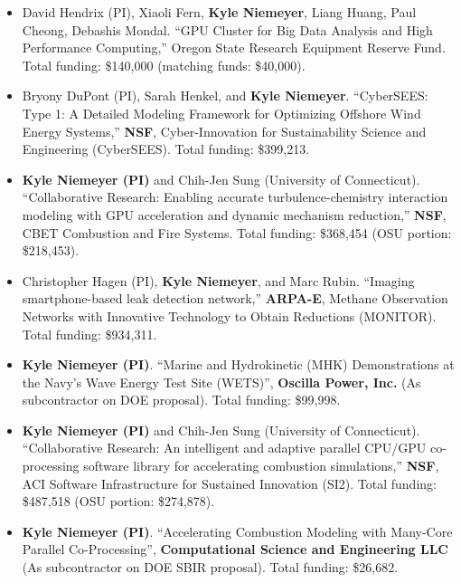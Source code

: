 \documentclass[margin,line,11pt]{res}
\begin{document}
\begin{resume}
\begin{itemize}[leftmargin=*]

\item David Hendrix (PI), Xiaoli Fern, \textbf{Kyle Niemeyer}, Liang Huang, Paul Cheong, Debashis Mondal. ``GPU Cluster for Big Data Analysis and High Performance Computing,'' Oregon State Research Equipment Reserve Fund. Total funding: \$140,000 (matching funds: \$40,000).

\item Bryony DuPont (PI), Sarah Henkel, and \textbf{Kyle Niemeyer}. ``CyberSEES: Type 1: A Detailed Modeling Framework for Optimizing Offshore Wind Energy Systems,'' \textbf{NSF}, Cyber-Innovation for Sustainability Science and Engineering (CyberSEES). Total funding: \$399,213.

\item \textbf{Kyle Niemeyer (PI)} and Chih-Jen Sung (University of Connecticut). ``Collaborative Research: Enabling accurate turbulence-chemistry interaction modeling with GPU acceleration and dynamic mechanism reduction,'' \textbf{NSF}, CBET Combustion and Fire Systems. Total funding: \$368,454 (OSU portion: \$218,453).

\item Christopher Hagen (PI), \textbf{Kyle Niemeyer}, and Marc Rubin. ``Imaging smartphone-based leak detection network,'' \textbf{ARPA-E}, Methane Observation Networks with Innovative Technology to Obtain Reductions (MONITOR). Total funding: \$934,311.

\item \textbf{Kyle Niemeyer (PI)}. ``Marine and Hydrokinetic (MHK) Demonstrations at the Navy's Wave Energy Test Site (WETS)'', \textbf{Oscilla Power, Inc.} (As subcontractor on DOE proposal). Total funding: \$99,998.

\item \textbf{Kyle Niemeyer (PI)} and Chih-Jen Sung (University of Connecticut). ``Collaborative Research: An intelligent and adaptive parallel CPU\slash GPU co-processing software library for accelerating combustion simulations,'' \textbf{NSF}, ACI Software Infrastructure for Sustained Innovation (SI2). Total funding: \$487,518 (OSU portion: \$274,878).

\item \textbf{Kyle Niemeyer (PI)}. ``Accelerating Combustion Modeling with Many-Core Parallel Co-Pro\-cessing'', \textbf{Computational Science and Engineering LLC} (As subcontractor on DOE SBIR proposal). Total funding: \$26,682.

\end{itemize}

\end{resume}
\end{document}
